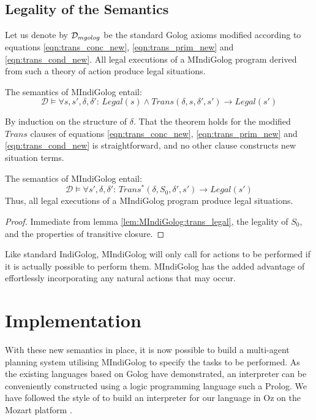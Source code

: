 \subsection{Legality of the Semantics}

Let us denote by $\mathcal{D}_{mgolog}$ be the standard Golog axioms modified
according to equations \eqref{eqn:trans_conc_new}, \eqref{eqn:trans_prim_new}
and \eqref{eqn:trans_cond_new}. All legal executions of a MIndiGolog
program derived from such a theory of action produce legal situations.

\begin{lemma}
The semantics of MIndiGolog entail:\label{lem:MIndiGolog:trans_legal}\[
\mathcal{D}\models\forall s,s',\delta,\delta':\, Legal(s)\wedge Trans(\delta,s,\delta',s')\rightarrow Legal(s')\]

\end{lemma}
\begin{proofsketch}
By induction on the structure of $\delta$. That the theorem holds
for the modified $Trans$ clauses of equations \eqref{eqn:trans_conc_new},
\eqref{eqn:trans_prim_new} and \eqref{eqn:trans_cond_new} is straightforward,
and no other clause constructs new situation terms. 
\end{proofsketch}
\begin{thm}
The semantics of MIndiGolog entail: \[
\mathcal{D}\models\forall s',\delta,\delta':\, Trans^{*}(\delta,S_{0},\delta',s')\rightarrow Legal(s')\]
 Thus, all legal executions of a MIndiGolog program produce legal
situations. 
\end{thm}
\begin{proof}
Immediate from lemma \ref{lem:MIndiGolog:trans_legal}, the legality
of $S_{0}$, and the properties of transitive closure. 
\end{proof}
Like standard IndiGolog, MIndiGolog will only call for actions to
be performed if it is actually possible to perform them. MIndiGolog
has the added advantage of effortlessly incorporating any natural
actions that may occur.


\section{Implementation\label{sec:MIndiGolog:Implementation}}

With these new semantics in place, it is now possible to build a multi-agent
planning system utilising MIndiGolog to specify the tasks to be performed.
As the existing languages based on Golog have demonstrated, an interpreter
can be conveniently constructed using a logic programming language
such a Prolog. We have followed the style of \citep{giacomo00congolog,giacomo99indigolog}
to build an interpreter for our language in Oz on the Mozart platform
\citep{vanroy03mozart_logic}.

